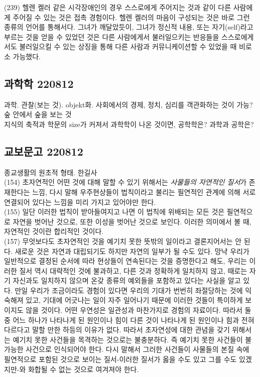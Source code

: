 \documentclass[12pt, a4paper]{article}
\begin{document}
(239) 헬렌 켈러 같은 시각장애인의 경우 스스로에게 주어지는 것과 같이 다른 사람에게 주어질 수 있는 것은 접촉 경험이다. 헬렌 켈러의 마음이 구성되는 것은 바로 그런 종류의 언어를 통해서다. 그녀가 깨달았듯이, 그녀가 정신적 내용, 또는 자기(self)라고 부르는 것을 얻을 수 있었던 것은 다른 사람에게서 불러일으키는 반응들을 스스로에게서도 불러일으킬 수 있는 상징을 통해 다른 사람과 커뮤니케이션할 수 있었을 때 비로소 가능했다. 




\newpage
\subsection{과학학 220812}
과학. 관찰(보는 것). objekt화. 사회에서의 경제, 정치, 심리를 객관화하는 것이 가능? 숲 안에서 숲을 보는 것 \\

지식의 축적과 학문의 size가 커져서 과학학이 나온 것이면, 공학학은? 과학과 공학은? \\


\newpage
\subsection{교보문고 220812}

종교생활의 원초적 형태. 한길사 \\
(154) 초자연적인 어떤 것에 대해 말할 수 있기 위해서는 \emph{사물들의 자연적인 질서}가 존재한다는 느낌, 다시 말해 우주현상들이 법칙이라고 불리는 필연적인 관계에 의해 서로 연결되어 있다는 느낌을 미리 가지고 있어야만 한다.  \\
(155) 일단 이러한 법칙이 받아들여지고 나면 이 법칙에 위배되는 모든 것은 필연적으로 자연을 벗어난 것으로, 또한 이성을 벗어난 것으로 보인다. 이러한 의미에서 볼 때, 자연적인 것이란 합리적인 것이다. \\
(157) 무엇보다도 초자연적인 것을 예기치 못한 뜻밖의 일이라고 결론지어서는 안 된다. 새로운 것은 자연과 대립되기도 하지만 자연의 일부가 될 수도 있다. 망냑 우리가 일반적으로 결정된 순서에 따라 현상들이 연속된다는 것을 증명한다고 해도, 우리는 이러한 질서 역시 대략적인 것에 불과하고, 다른 것과 정확하게 일치하지 않고, 때로는 자기 자신과도 일치하지 않으며 온갖 종류의 예외들을 포함하고 있다는 사실을 알고 있다. 만일 우리가 조금이라도 경험이 있다면 우리의 기대가 번번히 좌절당하는 것에 익숙해져 있고, 기대에 어긋나는 일이 자주 일어나기 때문에 이러한 것들이 특이하게 보이지도 않을 것이다. 어떤 우연성은 일관성과 마찬가지로 경험의 자료이다. 따라서 둘 중 어느 하나가 나타나게 된 원인이나 힘이 다른 것이 나타나게 된 원인이나 힘과 전혀 다르다고 말할 만한 하등의 이유가 없다. 따라서 초자연성에 대한 관념을 갖기 위해서는 예기치 못한 사건들을 목격하는 것으로는 불충분하다. 즉 예기치 못한 사건들이 불가능한 사건으로 인식되어야 한다. 다시 말해서 그러한 사건들이 사물들의 본질 속에 필연적으로 포함된 것으로 보이는 질서-이러한 질서가 옳을 수도 있고 그를 수도 있겠지만-와 화합될 수 없는 것으로 여겨져야 한다. \\
\end{document}
